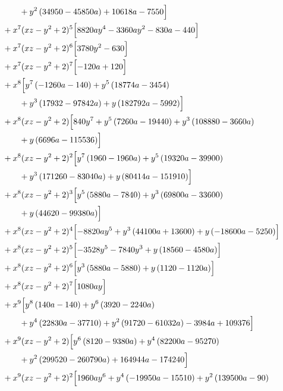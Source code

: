 \begin{align*}
&\qquad + y^{2} \left(34950 - 45850 a\right) + 10618 a - 7550\Bigr]\\
&{}+x^{7}(xz-y^2+2)^{5}\Bigl[8820 a y^{4} - 3360 a y^{2} - 830 a - 440\Bigr]\\
&{}+x^{7}(xz-y^2+2)^{6}\Bigl[3780 y^{2} - 630\Bigr]\\
&{}+x^{7}(xz-y^2+2)^{7}\Bigl[- 120 a + 120\Bigr]\\
&{}+x^{8}\Bigl[y^{7} \left(- 1260 a - 140\right) + y^{5} \left(18774 a - 3454\right)\\
&\qquad + y^{3} \left(17932 - 97842 a\right) + y \left(182792 a - 5992\right)\Bigr]\\
&{}+x^{8}(xz-y^2+2)\Bigl[840 y^{7} + y^{5} \left(7260 a - 19440\right) + y^{3} \left(108880 - 3660 a\right)\\
&\qquad + y \left(6696 a - 115536\right)\Bigr]\\
&{}+x^{8}(xz-y^2+2)^{2}\Bigl[y^{7} \left(1960 - 1960 a\right) + y^{5} \left(19320 a - 39900\right)\\
&\qquad + y^{3} \left(171260 - 83040 a\right) + y \left(80414 a - 151910\right)\Bigr]\\
&{}+x^{8}(xz-y^2+2)^{3}\Bigl[y^{5} \left(5880 a - 7840\right) + y^{3} \left(69800 a - 33600\right)\\
&\qquad + y \left(44620 - 99380 a\right)\Bigr]\\
&{}+x^{8}(xz-y^2+2)^{4}\Bigl[- 8820 a y^{5} + y^{3} \left(44100 a + 13600\right) + y \left(- 18600 a - 5250\right)\Bigr]\\
&{}+x^{8}(xz-y^2+2)^{5}\Bigl[- 3528 y^{5} - 7840 y^{3} + y \left(18560 - 4580 a\right)\Bigr]\\
&{}+x^{8}(xz-y^2+2)^{6}\Bigl[y^{3} \left(5880 a - 5880\right) + y \left(1120 - 1120 a\right)\Bigr]\\
&{}+x^{8}(xz-y^2+2)^{7}\Bigl[1080 a y\Bigr]\\
&{}+x^{9}\Bigl[y^{8} \left(140 a - 140\right) + y^{6} \left(3920 - 2240 a\right)\\
&\qquad + y^{4} \left(22830 a - 37710\right) + y^{2} \left(91720 - 61032 a\right) - 3984 a + 109376\Bigr]\\
&{}+x^{9}(xz-y^2+2)\Bigl[y^{6} \left(8120 - 9380 a\right) + y^{4} \left(82200 a - 95270\right)\\
&\qquad + y^{2} \left(299520 - 260790 a\right) + 164944 a - 174240\Bigr]\\
&{}+x^{9}(xz-y^2+2)^{2}\Bigl[1960 a y^{6} + y^{4} \left(- 19950 a - 15510\right) + y^{2} \left(139500 a - 90\right)\\

\end{align*}
